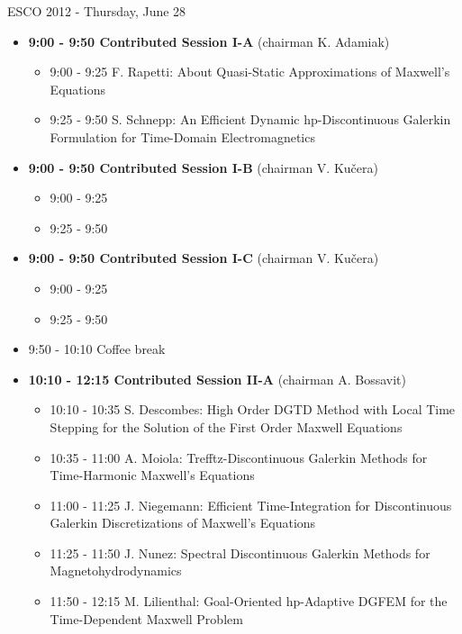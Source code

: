 \documentclass[10pt, A4]{article}%
\begin{document}
\newpage

\centerline{\huge ESCO 2012 - Thursday, June 28}
\vspace{4mm}

\begin{itemize}    
  \item {\bf 9:00 - 9:50 Contributed Session I-A} (chairman K. Adamiak) 
  \begin{itemize}
    \item 9:00 - 9:25 F. Rapetti: About Quasi-Static Approximations of Maxwell’s Equations
    \item 9:25 - 9:50 S. Schnepp: An Efficient Dynamic hp-Discontinuous Galerkin Formulation for Time-Domain Electromagnetics
  \end{itemize}
  \item {\bf 9:00 - 9:50 Contributed Session I-B} (chairman V. Ku\v cera) 
  \begin{itemize}
    \item 9:00 - 9:25 
    \item 9:25 - 9:50 
  \end{itemize}
    \item {\bf 9:00 - 9:50 Contributed Session I-C} (chairman V. Ku\v cera) 
  \begin{itemize}
    \item 9:00 - 9:25 
    \item 9:25 - 9:50 
  \end{itemize}
  \item 9:50 - 10:10 Coffee break
  \item {\bf 10:10 - 12:15 Contributed Session II-A} (chairman A. Bossavit) 
  \begin{itemize}
    \item 10:10 - 10:35 S. Descombes: High Order DGTD Method with Local Time Stepping for the Solution of the First Order Maxwell Equations
    \item 10:35 - 11:00 A. Moiola: Trefftz-Discontinuous Galerkin Methods for Time-Harmonic Maxwell’s Equations
    \item 11:00 - 11:25 J. Niegemann: Efficient Time-Integration for Discontinuous Galerkin Discretizations of Maxwell’s Equations
    \item 11:25 - 11:50 J. Nunez: Spectral Discontinuous Galerkin Methods for Magnetohydrodynamics
    \item 11:50 - 12:15 M. Lilienthal: Goal-Oriented hp-Adaptive DGFEM for the Time-Dependent Maxwell Problem
  \end{itemize}

\end{itemize}
\end{document}

